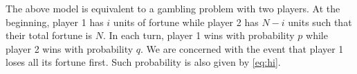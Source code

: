\documentclass{article}
\begin{document}
The above model is equivalent to a gambling problem with two players. At the beginning,
player 1 has $i$ units of fortune while
player 2 has $N-i$ units such that their total
fortune is $N$. In each turn, player 1 wins
with probability $p$ while player 2 wins
with probability $q$. We are concerned with
the event that player 1 loses all its fortune first. Such probability is also given by
\eqref{eq:hi}.
\end{document}
